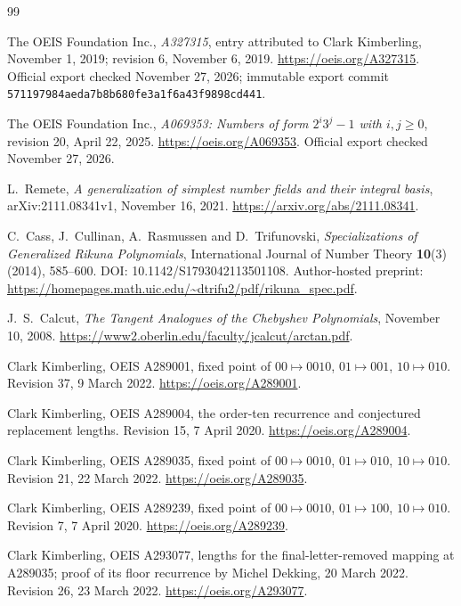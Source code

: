 \documentclass[11pt]{article}
\begin{document}
\begin{thebibliography}{99}
\raggedright

The OEIS Foundation Inc., \emph{A327315}, entry attributed to Clark
Kimberling, November 1, 2019; revision 6, November 6, 2019.
\url{https://oeis.org/A327315}.
Official export checked November 27, 2026; immutable export commit
\texttt{571197984aeda7b8b680fe3a1f6a43f9898cd441}.

The OEIS Foundation Inc., \emph{A069353: Numbers of form $2^i3^j-1$
with $i,j\ge0$}, revision 20, April 22, 2025.
\url{https://oeis.org/A069353}.
Official export checked November 27, 2026.

L.~Remete, \emph{A generalization of simplest number fields and their
integral basis}, arXiv:2111.08341v1, November 16, 2021.
\url{https://arxiv.org/abs/2111.08341}.

C.~Cass, J.~Cullinan, A.~Rasmussen and D.~Trifunovski,
\emph{Specializations of Generalized Rikuna Polynomials},
International Journal of Number Theory \textbf{10}(3) (2014), 585--600.
DOI: 10.1142/S1793042113501108.
Author-hosted preprint:
\url{https://homepages.math.uic.edu/~dtrifu2/pdf/rikuna_spec.pdf}.

J.~S.~Calcut, \emph{The Tangent Analogues of the Chebyshev Polynomials},
November 10, 2008.
\url{https://www2.oberlin.edu/faculty/jcalcut/arctan.pdf}.

Clark Kimberling, OEIS A289001, fixed point of
$00\mapsto0010$, $01\mapsto001$, $10\mapsto010$.
Revision 37, 9 March 2022.
\url{https://oeis.org/A289001}.

Clark Kimberling, OEIS A289004, the order-ten recurrence and
conjectured replacement lengths.
Revision 15, 7 April 2020.
\url{https://oeis.org/A289004}.

Clark Kimberling, OEIS A289035, fixed point of
$00\mapsto0010$, $01\mapsto010$, $10\mapsto010$.
Revision 21, 22 March 2022.
\url{https://oeis.org/A289035}.

Clark Kimberling, OEIS A289239, fixed point of
$00\mapsto0010$, $01\mapsto100$, $10\mapsto010$.
Revision 7, 7 April 2020.
\url{https://oeis.org/A289239}.

Clark Kimberling, OEIS A293077, lengths for the final-letter-removed
mapping at A289035; proof of its floor recurrence by Michel Dekking,
20 March 2022. Revision 26, 23 March 2022.
\url{https://oeis.org/A293077}.


\end{thebibliography}
\end{document}
